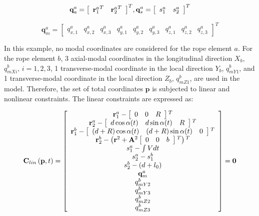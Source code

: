 \begin{equation}
  {\textbf{q}}_a^{a} = {\left[ {\begin{array}{*{20}{c}}{{{\bf{r}}_1^{a}}^T}&{{{\bf{r}}_2^{a}}^T} \end{array}} \right]^T},     {\bf{q}}_s^{a} = {\left[ {\begin{array}{*{20}{c}}{{s_1^a}}&{{s_2^a}}\end{array}} \right]^T}  
\end{equation}

\begin{equation}
    {\textbf{q}}_m^{a} = \left[ {\begin{array}{*{20}{c}}{{q_{x,1}^a}}&{{q_{x,2}^a}} &{{q_{x,3}^a}}&{{q_{y,1}^a}}&{{q_{y,2}^a}}& {{q_{y,3}^a}}&{{q_{z,1}^a}}&{{q_{z,2}^a}}& {{q_{z,3}^a}}\end{array}} \right]^T 
\end{equation}

In this example, no modal coordinates are considered for the rope element $a$. For the rope element $b$, 3 axial-modal coordinates in the longitudinal direction $X_b$, $q_{mXi}^b,\, i = 1,2,3$, 1 transverse-modal coordinate in the local direction $Y_b$, $q_{mY1}^b$, and 1 transverse-modal coordinate in the local direction $Z_b$, $q_{mZ1}^b$, are used in the model. Therefore, the set of total coordinates $\textbf{p}$ is subjected to linear and nonlinear constraints. The linear constraints are expressed as:

\begin{equation} \label{Clin_Elev}
{{\bf{C}}_{lin}}\left( {{\bf{p}},t} \right) = \left[ {\begin{array}{*{20}{c}}
{{\bf{r}}_1^a - \left[ {\begin{array}{*{20}{c}}
0&0&R
\end{array}} \right]{}^T}\\
{{\bf{r}}_2^a - \left[ {\begin{array}{*{20}{c}}
{d\cos \alpha (t)}&{d\sin \alpha (t)}&R
\end{array}} \right]{}^T}\\
{{\bf{r}}_1^b - \left[ {\begin{array}{*{20}{c}}
{\left( {d + R} \right)\cos \alpha (t)}&{\left( {d + R} \right)\sin \alpha (t)}&0
\end{array}} \right]{}^T}\\
{{\bf{r}}_2^b - \left( {{{\bf{r}}^2} + {{\bf{A}}^2}\left[ {\begin{array}{*{20}{c}}
0&0&b
\end{array}} \right]{}^T} \right){}^T}\\
{s_1^a - \int {Vdt} }\\
{s_2^a - s_1^b}\\
{s_2^b - \left( {d + {l_0}} \right)}\\
{{\bf{q}}_m^a}\\
{q_{mY2}^b}\\
{q_{mY3}^b}\\
{q_{mZ2}^b}\\
{q_{mZ3}^b}
\end{array}} \right] = {\bf{0}}
\end{equation}

